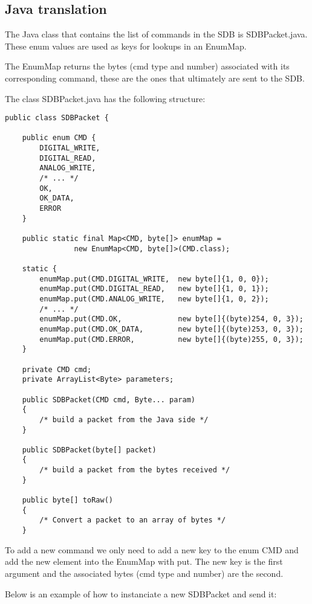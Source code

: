 \documentclass[12pt,a4paper]{report}
\begin{document}
\subsection*{Java translation}

The Java class that contains the list of commands in the SDB is SDBPacket.java. These enum values are used as keys for lookups in an EnumMap.

The EnumMap returns the bytes (cmd type and number) associated with its corresponding command, these are the ones that ultimately are sent to the SDB.

The class SDBPacket.java has the following structure:

\begin{lstlisting}
public class SDBPacket {

    public enum CMD {
        DIGITAL_WRITE,
        DIGITAL_READ,
        ANALOG_WRITE,
        /* ... */
        OK,
        OK_DATA,
        ERROR
    }
    
    public static final Map<CMD, byte[]> enumMap =
                new EnumMap<CMD, byte[]>(CMD.class);
    
    static {
        enumMap.put(CMD.DIGITAL_WRITE,  new byte[]{1, 0, 0});
        enumMap.put(CMD.DIGITAL_READ,   new byte[]{1, 0, 1});
        enumMap.put(CMD.ANALOG_WRITE,   new byte[]{1, 0, 2});
        /* ... */
        enumMap.put(CMD.OK,             new byte[]{(byte)254, 0, 3});
        enumMap.put(CMD.OK_DATA,        new byte[]{(byte)253, 0, 3});
        enumMap.put(CMD.ERROR,          new byte[]{(byte)255, 0, 3});
    }

    private CMD cmd;
    private ArrayList<Byte> parameters;
    
    public SDBPacket(CMD cmd, Byte... param)
    {
        /* build a packet from the Java side */
    }
    
    public SDBPacket(byte[] packet)
    {
        /* build a packet from the bytes received */  
    }
    
    public byte[] toRaw()
    {
        /* Convert a packet to an array of bytes */
    }
\end{lstlisting}

To add a new command we only need to add a new key to the enum CMD and add the new element into the EnumMap with put. The new key is the first argument and the associated bytes (cmd type and number) are the second.

Below is an example of how to instanciate a new SDBPacket and send it:
\end{document}
